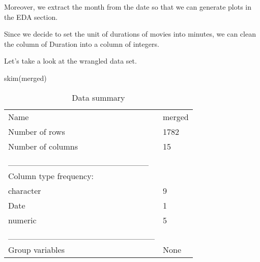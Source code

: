\documentclass[
]{article}
\newenvironment{Shaded}{\begin{snugshade}}{\end{snugshade}}
\newcommand{\CommentTok}[1]{\textcolor[rgb]{0.56,0.35,0.01}{\textit{#1}}}
\newcommand{\DecValTok}[1]{\textcolor[rgb]{0.00,0.00,0.81}{#1}}
\newcommand{\FunctionTok}[1]{\textcolor[rgb]{0.00,0.00,0.00}{#1}}
\newcommand{\NormalTok}[1]{#1}
\newcommand{\OtherTok}[1]{\textcolor[rgb]{0.56,0.35,0.01}{#1}}
\newcommand{\SpecialCharTok}[1]{\textcolor[rgb]{0.00,0.00,0.00}{#1}}
\begin{document}
Moreover, we extract the month from the date so that we can generate
plots in the EDA section.

\begin{Shaded}
\end{Shaded}

Since we decide to set the unit of durations of movies into minutes, we
can clean the column of Duration into a column of integers.

\begin{Shaded}
\end{Shaded}

Let's take a look at the wrangled data set.

\begin{Shaded}
\begin{Highlighting}[]
\FunctionTok{skim}\NormalTok{(merged)}
\end{Highlighting}
\end{Shaded}

\begin{longtable}[]{@{}ll@{}}
\caption{Data summary}\tabularnewline
\toprule()
\endhead
Name & merged \\
Number of rows & 1782 \\
Number of columns & 15 \\
\_\_\_\_\_\_\_\_\_\_\_\_\_\_\_\_\_\_\_\_\_\_\_ & \\
Column type frequency: & \\
character & 9 \\
Date & 1 \\
numeric & 5 \\
\_\_\_\_\_\_\_\_\_\_\_\_\_\_\_\_\_\_\_\_\_\_\_\_ & \\
Group variables & None \\
\bottomrule()
\end{longtable}
\end{document}
